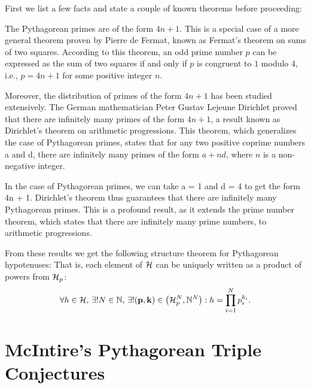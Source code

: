 \documentclass{article}
\theoremstyle{definition}
\begin{document}
First we list a few facts and state a couple of known theorems before proceeding:
\begin{enumerate}
  \item{The Pythagorean primes are of the form $4n + 1$. 
      This is a special case of a more general theorem proven by 
        Pierre de Fermat, known as Fermat's theorem on sums of two squares. 
      According to this theorem, an odd prime number $p$ can be expressed as 
        the sum of two squares if and only if 
      $p$ is congruent to $1$ modulo $4$, i.e., $p = 4n + 1$ for some 
        positive integer $n$. 
    \item{Moreover, the distribution of primes of the form $4n + 1$ has 
        been studied extensively.}
      The German mathematician Peter Gustav Lejeune Dirichlet proved that 
        there are infinitely many primes of the form $4n + 1$, a result known as 
      Dirichlet's theorem on arithmetic progressions. 
      This theorem, which generalizes the case of Pythagorean primes, states 
        that for any two positive coprime numbers a and d, 
      there are infinitely many primes of the form $a + nd$, where $n$ is a 
        non-negative integer.} 
    \item{In the case of Pythagorean primes, we can take a = 1 and d = 4 to 
        get the form 4n + 1. 
          Dirichlet's theorem thus guarantees that there are infinitely 
          many Pythagorean primes. 
        This is a profound result, as it extends the prime number theorem, 
        which states that there are infinitely many prime numbers, to 
        arithmetic progressions.}
\end{enumerate}
From these results we get the following structure theorem for 
    Pythagorean hypotenuses:
         That is, each element of ${\cal H}$ can be uniquely written as a product of powers from ${\cal H}_p$:
         \begin{eqnarray}
           \forall h \in {\cal H},\, \exists ! N \in \mathbb{N}, \, \exists ! ({\bf p},{\bf k}) \in \left({\cal H}_p^{N}, \mathbb{N}^{N}\right): h = \prod_{i=1}^N p_{i}^{k_i}.
         \end{eqnarray}


\section{McIntire's Pythagorean Triple Conjectures}
\end{document}
